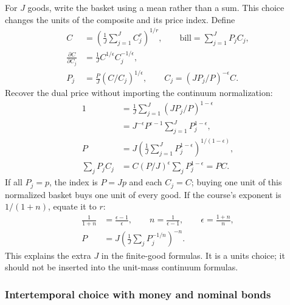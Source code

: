 For $J$ goods, write the basket using a mean rather than a sum. This choice
changes the units of the composite and its price index. Define
\begin{align}
 C&=\left(\frac1J\sum_{j=1}^J C_j^r\right)^{1/r},\qquad
 \text{bill}=\sum_{j=1}^JP_jC_j,\\
 \frac{\partial C}{\partial C_j}
 &=\frac1J C^{1/\epsilon}C_j^{-1/\epsilon},\\
 P_j&=\frac{P}{J}(C/C_j)^{1/\epsilon},\qquad
 C_j=(JP_j/P)^{-\epsilon}C.
\end{align}
Recover the dual price without importing the continuum normalization:
\begin{align}
 1&=\frac1J\sum_{j=1}^J(JP_j/P)^{1-\epsilon}\\
  &=J^{-\epsilon}P^{\epsilon-1}\sum_{j=1}^JP_j^{1-\epsilon},\\
 P&=J\left(\frac1J\sum_{j=1}^JP_j^{1-\epsilon}\right)^{1/(1-\epsilon)},\\
 \sum_jP_jC_j&=C(P/J)^\epsilon\sum_jP_j^{1-\epsilon}=PC.
\end{align}
If all $P_j=p$, the index is $P=Jp$ and each $C_j=C$; buying one unit of
this normalized basket buys one unit of every good. If the course's exponent is
$1/(1+n)$, equate it to $r$:
\begin{align}
 \frac1{1+n}&=\frac{\epsilon-1}{\epsilon},\qquad
 n=\frac1{\epsilon-1},\qquad
 \epsilon=\frac{1+n}{n},\\
 P&=J\left(\frac1J\sum_jP_j^{-1/n}\right)^{-n}.
\end{align}
This explains the extra $J$ in the finite-good formulas. It is a units choice;
it should not be inserted into the unit-mass continuum formulas.

\subsubsection{Intertemporal choice with money and nominal bonds}

